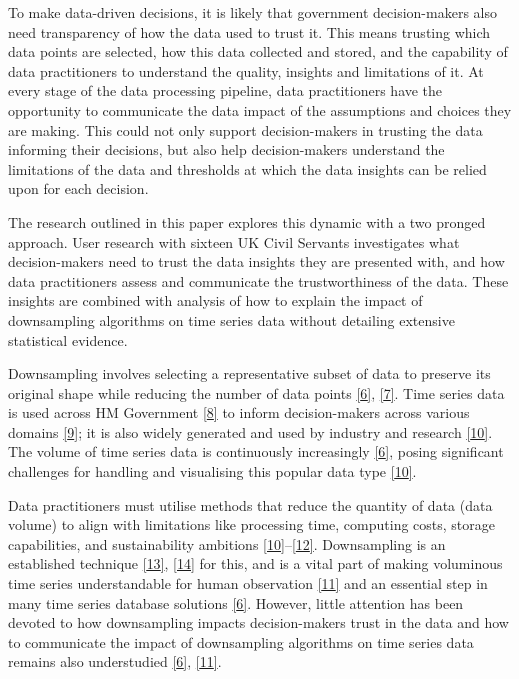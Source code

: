 \documentclass{article}
\begin{document}
To make data-driven decisions, it is likely that government
decision-makers also need transparency of how the data used to trust it.
This means trusting which data points are selected, how this data
collected and stored, and the capability of data practitioners to
understand the quality, insights and limitations of it. At every stage
of the data processing pipeline, data practitioners have the opportunity
to communicate the data impact of the assumptions and choices they are
making. This could not only support decision-makers in trusting the data
informing their decisions, but also help decision-makers understand the
limitations of the data and thresholds at which the data insights can be
relied upon for each decision.

The research outlined in this paper explores this dynamic with a two
pronged approach. User research with sixteen UK Civil Servants
investigates what decision-makers need to trust the data insights they
are presented with, and how data practitioners assess and communicate
the trustworthiness of the data. These insights are combined with
analysis of how to explain the impact of downsampling algorithms on time
series data without detailing extensive statistical evidence.

Downsampling involves selecting a representative subset of data to
preserve its original shape while reducing the number of data points
\protect\hyperlink{ref-datapoint}{{[}6{]}},
\protect\hyperlink{ref-MinMaxLTTB}{{[}7{]}}. Time series data is used
across HM Government \protect\hyperlink{ref-pathway}{{[}8{]}} to inform
decision-makers across various domains
\protect\hyperlink{ref-onstool}{{[}9{]}}; it is also widely generated
and used by industry and research
\protect\hyperlink{ref-TVStore}{{[}10{]}}. The volume of time series
data is continuously increasingly
\protect\hyperlink{ref-datapoint}{{[}6{]}}, posing significant
challenges for handling and visualising this popular data type
\protect\hyperlink{ref-TVStore}{{[}10{]}}.

Data practitioners must utilise methods that reduce the quantity of data
(data volume) to align with limitations like processing time, computing
costs, storage capabilities, and sustainability ambitions
\protect\hyperlink{ref-TVStore}{{[}10{]}}--\protect\hyperlink{ref-Shift}{{[}12{]}}.
Downsampling is an established technique
\protect\hyperlink{ref-downsampling}{{[}13{]}},
\protect\hyperlink{ref-sampling}{{[}14{]}} for this, and is a vital part
of making voluminous time series understandable for human observation
\protect\hyperlink{ref-Sveinn}{{[}11{]}} and an essential step in many
time series database solutions
\protect\hyperlink{ref-datapoint}{{[}6{]}}. However, little attention
has been devoted to how downsampling impacts decision-makers trust in
the data and how to communicate the impact of downsampling algorithms on
time series data remains also understudied
\protect\hyperlink{ref-datapoint}{{[}6{]}},
\protect\hyperlink{ref-Sveinn}{{[}11{]}}.
\end{document}
